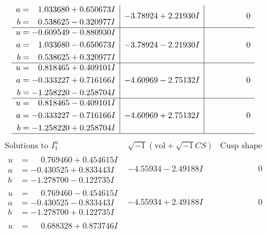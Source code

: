 \documentclass[1p]{elsarticle_modified}
\theoremstyle{definition}
\newcommand{\I}{\sqrt{-1}}
\begin{document}
$$\begin{array}{c|c|c}
\begin{aligned}
a &= \phantom{-}1.033680 + 0.650673 I \\
b &= \phantom{-}0.538625 - 0.320977 I\end{aligned}
 & -3.78924 + 2.21930 I & \phantom{-0.000000 } 0 \\ \hline\begin{aligned}
u &= -0.609549 - 0.880930 I \\
a &= \phantom{-}1.033680 - 0.650673 I \\
b &= \phantom{-}0.538625 + 0.320977 I\end{aligned}
 & -3.78924 - 2.21930 I & \phantom{-0.000000 } 0 \\ \hline\begin{aligned}
u &= \phantom{-}0.818465 + 0.409101 I \\
a &= -0.333227 + 0.716166 I \\
b &= -1.258220 - 0.258704 I\end{aligned}
 & -4.60969 - 2.75132 I & \phantom{-0.000000 } 0 \\ \hline\begin{aligned}
u &= \phantom{-}0.818465 - 0.409101 I \\
a &= -0.333227 - 0.716166 I \\
b &= -1.258220 + 0.258704 I\end{aligned}
 & -4.60969 + 2.75132 I & \phantom{-0.000000 } 0\\
 \hline 
 \end{array}$$\newpage$$\begin{array}{c|c|c}  
\text{Solutions to }I^u_{1}& \I (\text{vol} + \sqrt{-1}CS) & \text{Cusp shape}\\
 \hline 
\begin{aligned}
u &= \phantom{-}0.769460 + 0.454615 I \\
a &= -0.430525 + 0.833443 I \\
b &= -1.278700 - 0.122735 I\end{aligned}
 & -4.55934 - 2.49188 I & \phantom{-0.000000 } 0 \\ \hline\begin{aligned}
u &= \phantom{-}0.769460 - 0.454615 I \\
a &= -0.430525 - 0.833443 I \\
b &= -1.278700 + 0.122735 I\end{aligned}
 & -4.55934 + 2.49188 I & \phantom{-0.000000 } 0 \\ \hline\begin{aligned}
u &= \phantom{-}0.688328 + 0.873746 I \\

\end{aligned}
\end{array}$$
\end{document}
